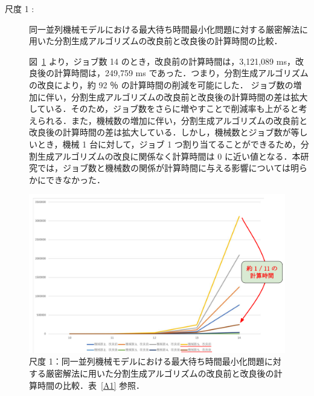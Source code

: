 \documentclass[12pt]{optlab-bachelor}
\begin{document}
\begin{description}
  \item[尺度 1 :] 同一並列機械モデルにおける最大待ち時間最小化問題に対する厳密解法に用いた分割生成アルゴリズムの改良前と改良後の計算時間の比較．

  図~\ref{5.1} より，ジョブ数 14 のとき，改良前の計算時間は，3,121,089 ms，改良後の計算時間は，249,759 ms であった．つまり，分割生成アルゴリズムの改良により，約 92 ％ の計算時間の削減を可能にした．
  ジョブ数の増加に伴い，分割生成アルゴリズムの改良前と改良後の計算時間の差は拡大している．そのため，ジョブ数をさらに増やすことで削減率も上がると考えられる．また，機械数の増加に伴い，分割生成アルゴリズムの改良前と改良後の計算時間の差は拡大している．しかし，機械数とジョブ数が等しいとき，機械 1 台に対して，ジョブ 1 つ割り当てることができるため，分割生成アルゴリズムの改良に関係なく計算時間は 0 に近い値となる．本研究では，ジョブ数と機械数の関係が計算時間に与える影響については明らかにできなかった．
\end{description}
\begin{figure}[ht]
  \centering
  \includegraphics[width = 16cm]{figure/rgfTimeId.pdf}
  \caption{尺度 1：同一並列機械モデルにおける最大待ち時間最小化問題に対する厳密解法に用いた分割生成アルゴリズムの改良前と改良後の計算時間の比較．表~\ref{A1} 参照．}
  \label{5.1}
\end{figure}
\end{document}

